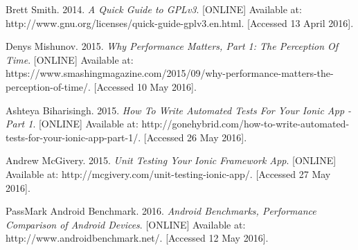 \documentclass{eplmastersthesis}
\begin{document}
\begin{thebibliography}{9}
\bibitem{} 
Brett Smith. 2014.
\textit{A Quick Guide to GPLv3}. 
[ONLINE] Available at: http://www.gnu.org/licenses/quick-guide-gplv3.en.html. [Accessed 13 April 2016].

\bibitem{}
Denys Mishunov. 2015.
\textit{Why Performance Matters, Part 1: The Perception Of Time}. 
[ONLINE] Available at: https://www.smashingmagazine.com/2015/09/why-performance-matters-the-perception-of-time/. [Accessed 10 May 2016].

\newpage

\bibitem{}
Ashteya Biharisingh. 2015. 
\textit{How To Write Automated Tests For Your Ionic App - Part 1}. 
[ONLINE] Available at: http://gonehybrid.com/how-to-write-automated-tests-for-your-ionic-app-part-1/. [Accessed 26 May 2016].


\bibitem{}
Andrew McGivery. 2015.
\textit{Unit Testing Your Ionic Framework App}. 
[ONLINE] Available at: http://mcgivery.com/unit-testing-ionic-app/. [Accessed 27 May 2016].

\bibitem{}
PassMark Android Benchmark. 2016. 
\textit{Android Benchmarks, Performance Comparison of Android Devices}. 
[ONLINE] Available at: http://www.androidbenchmark.net/. [Accessed 12 May 2016].
\end{thebibliography}
\newpage

\appendix
\end{document}
